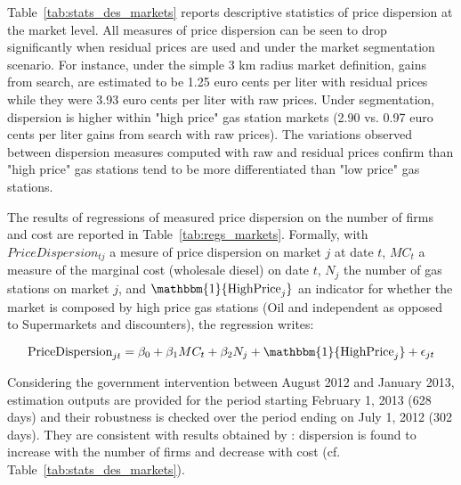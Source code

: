 \documentclass[english]{article}
\begin{document}
Table~\ref{tab:stats_des_markets} reports descriptive statistics of price dispersion at the market level. All measures of price dispersion can be seen to drop significantly when residual prices are used and under the market segmentation scenario. For instance, under the simple 3 km radius market definition, gains from search, are estimated to be 1.25 euro cents per liter with residual prices while they were 3.93 euro cents per liter with raw prices. Under segmentation, dispersion is higher within "high price" gas station markets (2.90 vs. 0.97 euro cents per liter gains from search with raw prices). The variations observed between dispersion measures computed with raw and residual prices confirm than "high price" gas stations tend to be more differentiated than "low price" gas stations.

The results of regressions of measured price dispersion on the number of firms and cost are reported in Table~\ref{tab:regs_markets}. Formally, with $PriceDispersion_{tj}$ a mesure of price dispersion on market $j$ at date $t$, $MC_t$ a measure of the marginal cost (wholesale diesel) on date $t$, $N_j$ the number of gas stations on market $j$, and $\mathbbm{1}{\text{HighPrice}_{j}}$ an indicator for whether the market is composed by high price gas stations (Oil and independent as opposed to Supermarkets and discounters), the regression writes:

\begin{equation}
\text{PriceDispersion}_{jt}= \beta_0 + \beta_1 MC_t + \beta_2 N_j + \mathbbm{1}{\text{HighPrice}_{j}} + \epsilon_{jt}
\end{equation}

Considering the government intervention between August 2012 and January 2013, estimation outputs are provided for the period starting February 1, 2013 (628 days) and their robustness is checked over the period ending on July 1, 2012 (302 days). They are consistent with results obtained by \cite{TAP11}: dispersion is found to increase with the number of firms and decrease with cost (cf. Table~\ref{tab:stats_des_markets}).
\end{document}
